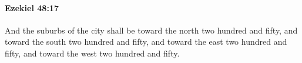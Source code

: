 
		\paragraph{Ezekiel 48:17} %
			\label{EZEKIEL-48-17}

			And the suburbs of the city shall be toward the north two hundred and fifty, and toward the south two hundred and fifty, and toward the east two hundred and fifty, and toward the west two hundred and fifty.


